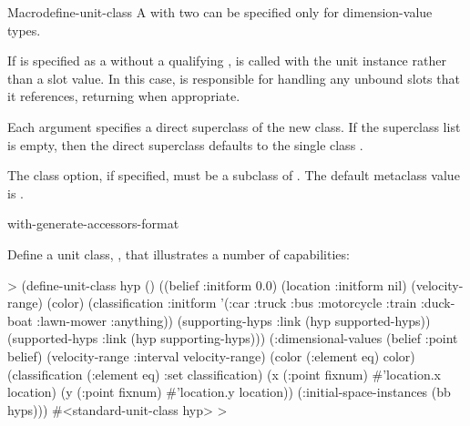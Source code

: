 \documentclass[10pt,twoside,english,pdftex]{article}
\begin{document}
\begin{functiondoc}{Macro}{define-unit-class}
\fndescription A  with two
 can be specified only for 
dimension-value types.

%
If  is specified as a  without a
qualifying ,  is called with the unit
instance rather than a slot value.  In this case,  is
responsible for handling any unbound slots that it references, returning
 when appropriate.

%
Each  argument specifies a direct superclass of the new
class. If the superclass list is empty, then the direct superclass defaults to
the single class .

%
The  class option, if specified, must be a subclass of
.  The default metaclass
value is .

\classoptioninheritance

\begin{alsos}{with-generate-accessors-format}
\end{alsos}

\fnexamples
%
Define a unit class, , that illustrates a number of
 capabilities:
%
\W\supp
\begin{example}
  > (define-unit-class hyp ()
      ((belief :initform 0.0)
       (location :initform nil)
       (velocity-range)
       (color)
       (classification :initform '(:car :truck :bus :motorcycle :train :duck-boat 
                                   :lawn-mower :anything))
       (supporting-hyps 
        :link (hyp supported-hyps))
       (supported-hyps 
        :link (hyp supporting-hyps)))
      (:dimensional-values 
       (belief :point belief)
       (velocity-range :interval velocity-range)
       (color (:element eq) color)
       (classification (:element eq) :set classification)
       (x (:point fixnum) #'location.x location)
       (y (:point fixnum) #'location.y location))
      (:initial-space-instances (bb hyps)))
  #<standard-unit-class hyp>
  >
\end{example}


\end{functiondoc}
\end{document}
